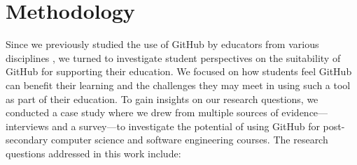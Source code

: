 \section{Methodology}
Since we previously studied the use of GitHub by educators from various disciplines \cite{zagalsky2015emergence}, we turned to investigate student perspectives on the suitability of GitHub for supporting their education. We focused on how students feel GitHub can benefit their learning and the challenges they may meet in using such a tool as part of their education. To gain insights on our research questions, we conducted a case study \cite{yin2013case,runeson2012case} where we drew from multiple sources of evidence---interviews and a survey---to investigate the potential of using GitHub for post-secondary computer science and software engineering courses. The research questions addressed in this work include:

%

